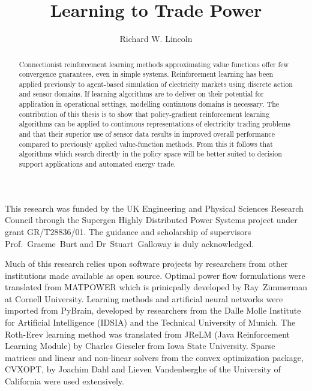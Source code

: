 \documentclass[12pt]{strath_thesis}
\title{Learning to Trade Power}
\author{Richard W. Lincoln}
\begin{document}
\maketitle

\setcounter{page}{1}

\declaration

\begin{acknowledgements}
This research was funded by the UK Engineering and Physical Sciences Research
Council through the Supergen Highly Distributed Power Systems project under
grant GR/T28836/01.
The guidance and scholarship of supervisors Prof.~Graeme~Burt and
Dr~Stuart~Galloway is duly acknowledged.

Much of this research relies upon software projects by researchers from other
institutions made available as open source.  Optimal power flow formulations
were translated from MATPOWER which is prinicpally developed by
Ray~Zimmerman at Cornell University.  Learning methods and artificial neural
networks were imported from PyBrain, developed by researchers from the Dalle
Molle Institute for Artificial Intelligence (IDSIA) and the Technical University of
Munich.  The Roth-Erev learning method was translated from JReLM (Java
Reinforcement Learning Module) by Charles Gieseler from Iowa State University.
Sparse matrices and linear and non-linear solvers from the convex optimization
package, CVXOPT, by Joachim Dahl and Lieven Vandenberghe of the University of
California were used extensively.
\end{acknowledgements}

\begin{abstract}
Connectionist reinforcement learning methods approximating value functions
offer few convergence guarantees, even in simple systems.  Reinforcement
learning has been applied previously to agent-based simulation of electricity
markets using discrete action and sensor domains. If learning algorithms
are to deliver on their potential for application in operational settings,
modelling continuous domains is necessary.  The contribution of this thesis is
to show that policy-gradient reinforcement learning algorithms can be applied
to continuous representations of electricity trading problems and that their
superior use of sensor data results in improved overall performance compared to
previously applied value-function methods.  From this it follows that
algorithms which search directly in the policy space will be better suited to
decision support applications and automated energy trade.
\end{abstract}
\end{document}
